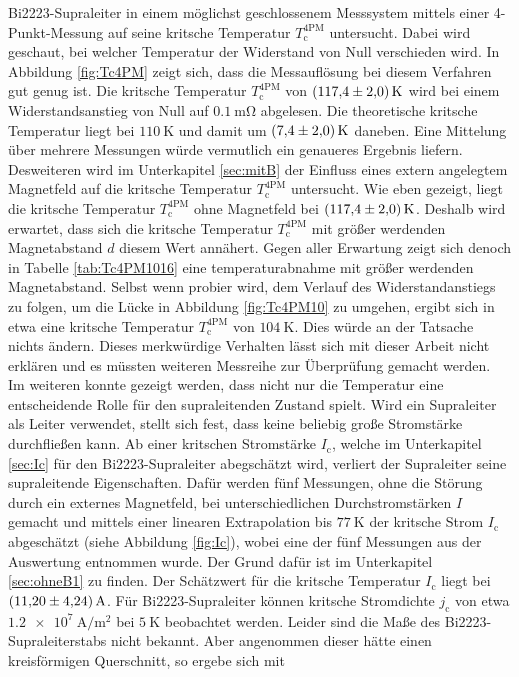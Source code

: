 Bi2223-Supraleiter in einem möglichst geschlossenem Messsystem mittels einer
4-Punkt-Messung auf seine kritsche Temperatur $T^{\text{4PM}}_{\text{c}}$
untersucht. Dabei wird geschaut, bei welcher Temperatur der Widerstand von Null
verschieden wird. In Abbildung \ref{fig:Tc4PM} zeigt sich, dass die Messauflösung
bei diesem Verfahren gut genug ist. Die kritsche Temperatur $T^{\text{4PM}}_{\text{c}}$ von
$\SI{117,4\pm2}{\kelvin}$ wird bei einem Widerstandsanstieg von Null auf $\SI{0.1}{\milli\ohm}$
abgelesen. Die theoretische kritsche Temperatur liegt bei $\SI{110}{\kelvin}$
\cite[S. 64]{Hohenester} und damit um $\SI{7,4\pm2}{\kelvin}$ daneben. Eine Mittelung
über mehrere Messungen würde vermutlich ein genaueres Ergebnis liefern.\\
Desweiteren wird im Unterkapitel \ref{sec:mitB} der Einfluss eines extern
angelegtem Magnetfeld auf die kritsche Temperatur $T^{\text{4PM}}_{\text{c}}$ untersucht.
Wie eben gezeigt, liegt die kritsche Temperatur $T^{\text{4PM}}_{\text{c}}$ ohne
Magnetfeld bei $\SI{117,4\pm2}{\kelvin}$. Deshalb wird erwartet, dass sich
die kritsche Temperatur $T^{\text{4PM}}_{\text{c}}$ mit größer werdenden Magnetabstand
$d$ diesem Wert annähert. Gegen aller Erwartung zeigt sich denoch in Tabelle
\ref{tab:Tc4PM1016} eine temperaturabnahme mit größer werdenden Magnetabstand.
Selbst wenn probier wird, dem Verlauf des Widerstandanstiegs zu folgen, um die
Lücke in Abbildung \ref{fig:Tc4PM10} zu umgehen, ergibt sich in etwa eine kritsche
Temperatur $T^{\text{4PM}}_{\text{c}}$ von $\SI{104}{\kelvin}$. Dies würde an der
Tatsache nichts ändern. Dieses merkwürdige Verhalten lässt sich mit dieser Arbeit
nicht erklären und es müssten weiteren Messreihe zur Überprüfung gemacht werden. \\
Im weiteren konnte gezeigt werden, dass nicht nur die Temperatur eine entscheidende
Rolle für den supraleitenden Zustand spielt. Wird ein Supraleiter als Leiter
verwendet, stellt sich fest, dass keine beliebig große Stromstärke durchfließen
kann. Ab einer kritschen Stromstärke $I_{\text{c}}$, welche im Unterkapitel \ref{sec:Ic}
für den Bi2223-Supraleiter abegschätzt wird, verliert der Supraleiter seine
supraleitende Eigenschaften. Dafür werden fünf Messungen, ohne die Störung durch ein
externes Magnetfeld, bei unterschiedlichen Durchstromstärken $I$ gemacht und mittels
einer linearen Extrapolation bis $\SI{77}{\kelvin}$ der kritsche Strom $I_{\text{c}}$
abgeschätzt (siehe Abbildung \ref{fig:Ic}), wobei eine der fünf Messungen aus der
Auswertung entnommen wurde. Der Grund dafür ist im Unterkapitel \ref{sec:ohneB1}
zu finden. Der Schätzwert für die kritsche Temperatur $I_{\text{c}}$ liegt bei
$\SI{11.2\pm4,24}{\ampere}$. Für Bi2223-Supraleiter können kritsche Stromdichte $j_{\text{c}}$
von etwa $\SI{1.2e7}{\ampere\per\metre\squared}$ bei $\SI{5}{\kelvin}$
\cite[S. 345]{2223} beobachtet werden. Leider sind die Maße des Bi2223-Supraleiterstabs
nicht bekannt. Aber angenommen dieser hätte einen kreisförmigen Querschnitt, so
ergebe sich mit

